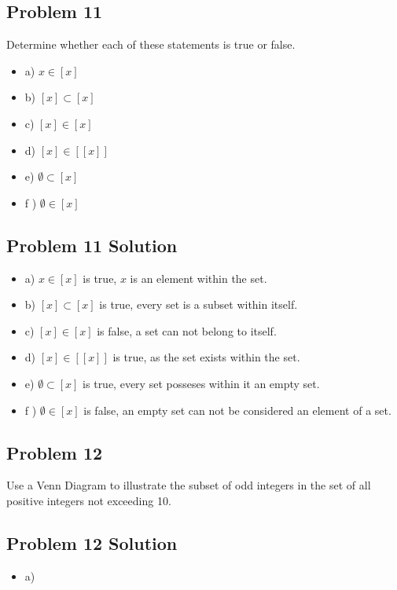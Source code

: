 \documentclass[11pt]{article}
\begin{document}
\subsection{Problem 11}

Determine whether each of these statements is true or false.

\begin{itemize}
\item a) $x \in [x]$
\item b) $[x] \subset [x]$
\item c) $[x] \in [x]$
\item d) $[x] \in [[x]]$
\item e) $\emptyset \subset  [x]$
\item f ) $\emptyset \in [x]$
\end{itemize}

\subsection {Problem 11 Solution}

\begin{itemize}
\item a) $x \in [x]$ is true, $x$ is an element within the set.
\item b) $[x] \subset [x]$ is true, every set is a subset within itself.
\item c) $[x] \in [x]$ is false, a set can not belong to itself.
\item d) $[x] \in [[x]]$ is true, as the set exists within the set.
\item e) $\emptyset \subset  [x]$ is true, every set posseses within it an empty set.
\item f ) $\emptyset \in [x]$ is false, an empty set can not be considered an element of a set.
\end{itemize}

\subsection{Problem 12}

Use a Venn Diagram to illustrate the subset of odd integers in the set of all positive integers not exceeding 10.

\subsection{Problem 12 Solution}

\begin{itemize}
\item a) \\
\\
\\
\\
\\
\\
\end{itemize}
\end{document}

